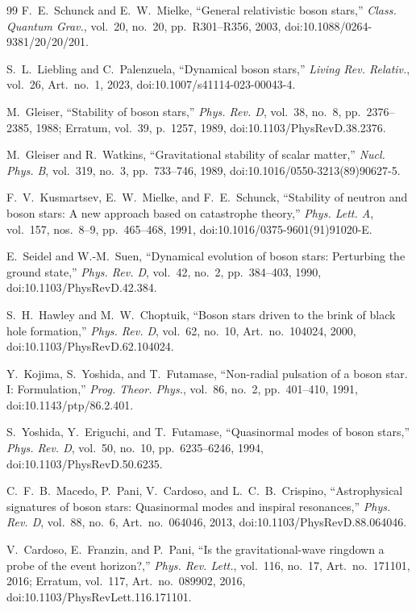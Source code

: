\documentclass[aps,prd,preprint,onecolumn,nofootinbib,superscriptaddress,showkeys]{revtex4-2}
\begin{document}
\begin{thebibliography}{99}
F.~E.~Schunck and E.~W.~Mielke,
``General relativistic boson stars,''
\emph{Class. Quantum Grav.}, vol.~20, no.~20, pp.~R301--R356, 2003,
doi:10.1088/0264-9381/20/20/201.

S.~L.~Liebling and C.~Palenzuela,
``Dynamical boson stars,''
\emph{Living Rev. Relativ.}, vol.~26, Art.~no.~1, 2023,
doi:10.1007/s41114-023-00043-4.

M.~Gleiser,
``Stability of boson stars,''
\emph{Phys. Rev. D}, vol.~38, no.~8, pp.~2376--2385, 1988;
Erratum, vol.~39, p.~1257, 1989,
doi:10.1103/PhysRevD.38.2376.

M.~Gleiser and R.~Watkins,
``Gravitational stability of scalar matter,''
\emph{Nucl. Phys. B}, vol.~319, no.~3, pp.~733--746, 1989,
doi:10.1016/0550-3213(89)90627-5.

F.~V.~Kusmartsev, E.~W.~Mielke, and F.~E.~Schunck,
``Stability of neutron and boson stars: A new approach based on catastrophe theory,''
\emph{Phys. Lett. A}, vol.~157, nos.~8--9, pp.~465--468, 1991,
doi:10.1016/0375-9601(91)91020-E.

E.~Seidel and W.-M.~Suen,
``Dynamical evolution of boson stars: Perturbing the ground state,''
\emph{Phys. Rev. D}, vol.~42, no.~2, pp.~384--403, 1990,
doi:10.1103/PhysRevD.42.384.

S.~H.~Hawley and M.~W.~Choptuik,
``Boson stars driven to the brink of black hole formation,''
\emph{Phys. Rev. D}, vol.~62, no.~10, Art.~no.~104024, 2000,
doi:10.1103/PhysRevD.62.104024.

Y.~Kojima, S.~Yoshida, and T.~Futamase,
``Non-radial pulsation of a boson star. I: Formulation,''
\emph{Prog. Theor. Phys.}, vol.~86, no.~2, pp.~401--410, 1991,
doi:10.1143/ptp/86.2.401.

S.~Yoshida, Y.~Eriguchi, and T.~Futamase,
``Quasinormal modes of boson stars,''
\emph{Phys. Rev. D}, vol.~50, no.~10, pp.~6235--6246, 1994,
doi:10.1103/PhysRevD.50.6235.

C.~F.~B.~Macedo, P.~Pani, V.~Cardoso, and L.~C.~B.~Crispino,
``Astrophysical signatures of boson stars: Quasinormal modes and inspiral resonances,''
\emph{Phys. Rev. D}, vol.~88, no.~6, Art.~no.~064046, 2013,
doi:10.1103/PhysRevD.88.064046.

V.~Cardoso, E.~Franzin, and P.~Pani,
``Is the gravitational-wave ringdown a probe of the event horizon?,''
\emph{Phys. Rev. Lett.}, vol.~116, no.~17, Art.~no.~171101, 2016;
Erratum, vol.~117, Art.~no.~089902, 2016,
doi:10.1103/PhysRevLett.116.171101.


\end{thebibliography}
\end{document}
